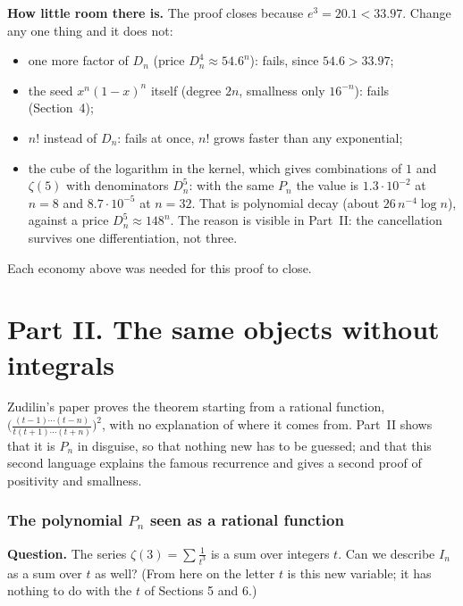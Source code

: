 \documentclass[11pt]{article}
\theoremstyle{remark}
\newcommand{\q}[1]{\medskip\noindent\textbf{#1}}
\begin{document}
\q{How little room there is.} The proof closes because $e^3=20.1<33.97$. Change any one thing and
it does not:
\begin{itemize}
\item one more factor of $D_n$ (price $D_n^4\approx54.6^n$): fails, since $54.6>33.97$;
\item the seed $x^n(1-x)^n$ itself (degree $2n$, smallness only $16^{-n}$): fails (Section~4);
\item $n!$ instead of $D_n$: fails at once, $n!$ grows faster than any exponential;
\item the cube of the logarithm in the kernel, which gives combinations of $1$ and $\zeta(5)$
with denominators $D_n^5$: with the same $P_n$ the value is $1.3\cdot10^{-2}$ at $n=8$ and
$8.7\cdot10^{-5}$ at $n=32$. That is polynomial decay (about $26\,n^{-4}\log n$), against a price
$D_n^5\approx148^n$. The reason is visible in Part~II: the cancellation survives one
differentiation, not three.
\end{itemize}
Each economy above was needed for this proof to close.

\part*{Part II. The same objects without integrals}

Zudilin's paper proves the theorem starting from a rational function,
$\bigl(\frac{(t-1)\cdots(t-n)}{t(t+1)\cdots(t+n)}\bigr)^2$, with no explanation of where it comes
from. Part~II shows that it is $P_n$ in disguise, so that nothing new has to be guessed; and that
this second language explains the famous recurrence and gives a second proof of positivity and
smallness.

\section{The polynomial $P_n$ seen as a rational function}

\q{Question.} The series $\zeta(3)=\sum\frac1{t^3}$ is a sum over integers $t$. Can we describe
$I_n$ as a sum over $t$ as well? (From here on the letter $t$ is this new variable; it has nothing
to do with the $t$ of Sections 5 and 6.)
\end{document}
